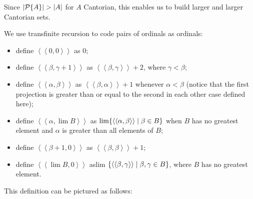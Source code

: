 Since $|{\cal P}\{A\}| > |A|$ for $A$ Cantorian, this
enables us to build larger and larger Cantorian sets.

\begin{definition}
 We use transfinite recursion to code
 pairs of
 ordinals as ordinals:
 \begin{itemize}
  \item define
    $\left<\left<0,0\right>\right>$ as 0;
  \item define $\left<\left<\beta,\gamma+1\right>\right>$ as
    $\left<\left<\beta,\gamma\right>\right> + 2$, where $\gamma <
    \beta$;
  \item define $\left<\left<\alpha,\beta\right>\right>$ as
    $\left<\left<\beta,\alpha\right>\right>+1$ whenever $\alpha < \beta$
    (notice that the first projection is greater than or equal to the
    second in each other case defined here);
  \item define
    $\left<\left<\alpha,\lim B\right>\right>$ as $\lim
    \{\left<\left<\alpha,\beta\right>\right> \mid \beta \in B\}$ when
    $B$ has no greatest element and $\alpha$ is greater than all
    elements of $B$;
  \item define $\left<\left<\beta+1,0\right>\right>$ as
    $\left<\left<\beta,\beta\right>\right>+1$;
  \item define $\left<\left<\lim
    B,0\right>\right>$ as\newline lim $\{\left<\left<\beta,\gamma\right>\right>
    \mid \beta,\gamma \in B\}$, where $B$ has no greatest element.
 \end{itemize}
\end{definition}
%
  This definition can be pictured as follows:

\vspace{-1.2\baselineskip}

